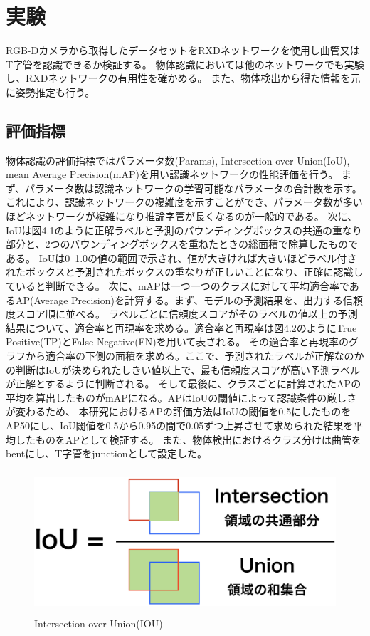 ﻿\chapter{%
実験}

RGB-Dカメラから取得したデータセットをRXDネットワークを使用し曲管又はT字管を認識できるか検証する。
物体認識においては他のネットワークでも実験し、RXDネットワークの有用性を確かめる。
また、物体検出から得た情報を元に姿勢推定も行う。

\section{評価指標}
物体認識の評価指標ではパラメータ数(Params), Intersection over Union(IoU), mean Average Precision(mAP)を用い認識ネットワークの性能評価を行う。
まず、パラメータ数は認識ネットワークの学習可能なパラメータの合計数を示す。これにより、認識ネットワークの複雑度を示すことができ、パラメータ数が多いほどネットワークが複雑になり推論字管が長くなるのが一般的である。
次に、IoUは図4.1のように正解ラベルと予測のバウンディングボックスの共通の重なり部分と、2つのバウンディングボックスを重ねたときの総面積で除算したものである。
IoUは0~1.0の値の範囲で示され、値が大きければ大きいほどラベル付されたボックスと予測されたボックスの重なりが正しいことになり、正確に認識していると判断できる。
次に、mAPは一つ一つのクラスに対して平均適合率であるAP(Average Precision)を計算する。まず、モデルの予測結果を、出力する信頼度スコア順に並べる。
ラベルごとに信頼度スコアがそのラベルの値以上の予測結果について、適合率と再現率を求める。適合率と再現率は図4.2のようにTrue Positive(TP)とFalse Negative(FN)を用いて表される。
その適合率と再現率のグラフから適合率の下側の面積を求める。ここで、予測されたラベルが正解なのかの判断はIoUが決められたしきい値以上で、最も信頼度スコアが高い予測ラベルが正解とするように判断される。
そして最後に、クラスごとに計算されたAPの平均を算出したものがmAPになる。APはIoUの閾値によって認識条件の厳しさが変わるため、
本研究におけるAPの評価方法はIoUの閾値を0.5にしたものをAP50にし、IoU閾値を0.5から0.95の間で0.05ずつ上昇させて求められた結果を平均したものをAPとして検証する。
また、物体検出におけるクラス分けは曲管をbentにし、T字管をjunctionとして設定した。
\clearpage

\begin{figure}[htbt]
	\centering
	 \includegraphics[height=53mm]{iou.eps}
	 \caption{Intersection over Union(IOU)}
	 \label{fig:f2}
\end{figure}

